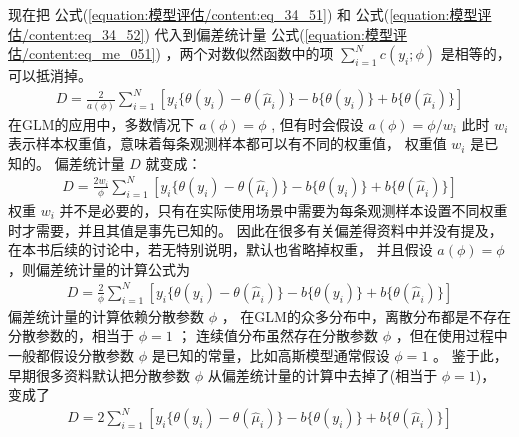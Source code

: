 \documentclass[letterpaper,10pt,english]{sphinxmanual}
\begin{document}
现在把 公式(\ref{equation:模型评估/content:eq_34_51}) 和 公式(\ref{equation:模型评估/content:eq_34_52}) 代入到偏差统计量 公式(\ref{equation:模型评估/content:eq_me_051})
，两个对数似然函数中的项 \(\sum_{i=1}^N  c(y_i;\phi)\) 是相等的，可以抵消掉。
\begin{equation}\label{equation:模型评估/content:eq_34_53}
\begin{split}D = \frac{2}{a(\phi)} \sum_{i=1}^N  [
y_i \{ \theta(y_i) - \theta(\hat{\mu}_i) \} - b\{\theta(y_i)\} + b\{\theta(\hat{\mu}_i)\} ]\end{split}
\end{equation}
在GLM的应用中，多数情况下 \(a(\phi)=\phi\) ,
但有时会假设 \(a(\phi)=\phi/w_i\)
此时 \(w_i\) 表示样本权重值，意味着每条观测样本都可以有不同的权重值，
权重值 \(w_i\) 是已知的。
偏差统计量 \(D\) 就变成：
\begin{equation}\label{equation:模型评估/content:模型评估/content:7}
\begin{split}D = \frac{2w_i}{\phi} \sum_{i=1}^N  [
y_i \{ \theta(y_i) - \theta(\hat{\mu}_i) \} - b\{\theta(y_i)\} + b\{\theta(\hat{\mu}_i)\} ]\end{split}
\end{equation}
权重 \(w_i\) 并不是必要的，只有在实际使用场景中需要为每条观测样本设置不同权重时才需要，并且其值是事先已知的。
因此在很多有关偏差得资料中并没有提及，在本书后续的讨论中，若无特别说明，默认也省略掉权重，
并且假设 \(a(\phi)=\phi\) ，则偏差统计量的计算公式为
\begin{equation}\label{equation:模型评估/content:模型评估/content:8}
\begin{split}D = \frac{2}{\phi} \sum_{i=1}^N  [
y_i \{ \theta(y_i) - \theta(\hat{\mu}_i) \} - b\{\theta(y_i)\} + b\{\theta(\hat{\mu}_i)\} ]\end{split}
\end{equation}
偏差统计量的计算依赖分散参数 \(\phi\) ，
在GLM的众多分布中，离散分布都是不存在分散参数的，相当于 \(\phi=1\) ；
连续值分布虽然存在分散参数 \(\phi\) ，但在使用过程中一般都假设分散参数 \(\phi\)
是已知的常量，比如高斯模型通常假设 \(\phi=1\) 。
鉴于此，早期很多资料默认把分散参数 \(\phi\) 从偏差统计量的计算中去掉了(相当于 \(\phi=1\))，
变成了
\begin{equation}\label{equation:模型评估/content:模型评估/content:9}
\begin{split}D = 2 \sum_{i=1}^N  [
y_i \{ \theta(y_i) - \theta(\hat{\mu}_i) \} - b\{\theta(y_i)\} + b\{\theta(\hat{\mu}_i)\} ]\end{split}
\end{equation}
\end{document}
